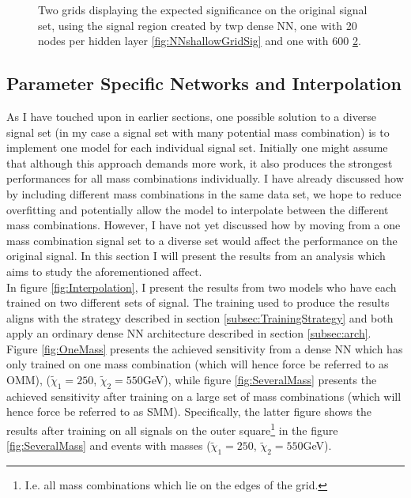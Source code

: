 \begin{figure}
{\begin{subfigure}{.6\textwidth}
        \vspace{-1.cm}
        \caption{}
        \label{fig:NNGridSig}
    \end{subfigure}
    }
    \caption{Two grids displaying the expected significance on the original signal set, using the signal region 
    created by twp dense \acs{NN}, one with 20 nodes per hidden layer \ref{fig:NNshallowGridSig} and one with 600 \ref{fig:NNGridSig}.}
\end{figure}
\subsection{Parameter Specific Networks and Interpolation}
As I have touched upon in earlier sections, one possible solution to a diverse signal set (in my case a signal set with many 
potential mass combination) is to implement one model for each individual signal set. Initially one might assume that although 
this approach demands more work, it also produces the strongest performances for all mass combinations individually. I have already 
discussed how by including different mass combinations in the same data set, we hope to reduce overfitting and potentially allow 
the model to interpolate between the different mass combinations. However, I have not yet discussed how by moving from a one 
mass combination signal set to a diverse set would affect the performance on the original signal. In this section I will present the 
results from an analysis which aims to study the aforementioned affect.
\\
In figure \ref{fig:Interpolation}, I present the results from two models who have each trained on two different sets of signal.
The training used to produce the results aligns with the strategy described in section \ref{subsec:TrainingStrategy} and both apply
an ordinary dense \ac{NN} architecture described in section \ref{subsec:arch}.
Figure \ref{fig:OneMass} presents the achieved sensitivity from a dense \ac{NN} which has only trained on one mass combination (which will 
hence force be referred to as \ac{OMM}), ($\tilde{\chi}_1=250$, $\tilde{\chi}_2=550$GeV), while figure \ref{fig:SeveralMass} presents the 
achieved sensitivity after training on a large set of mass combinations (which will hence force be referred 
to as \ac{SMM}). Specifically, the latter figure shows the results after training on all signals on the outer square\footnote{I.e. all mass combinations 
which lie on the edges of the grid.} in the figure \ref{fig:SeveralMass} and events with masses ($\tilde{\chi}_1=250$, $\tilde{\chi}_2=550$GeV).\\
